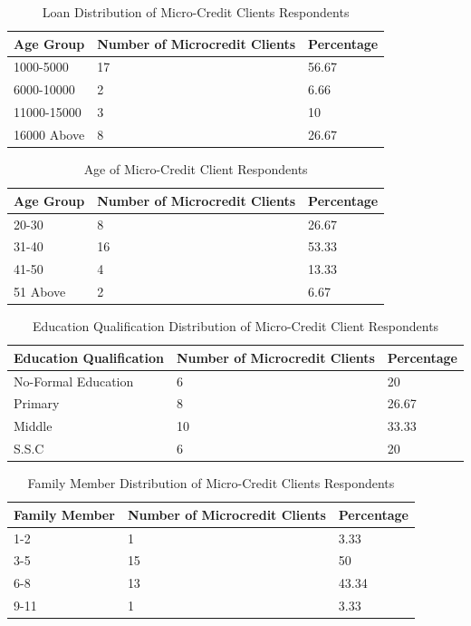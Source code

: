 \documentclass{report}
\begin{document}
\begin{table}[h!]
  \centering
  \begin{tabular}{|l|l|l|}
  \hline
    \textbf{Age Group} & \textbf{Number of Microcredit Clients} & \textbf{Percentage}\\
    \hline
    1000-5000 & 17 & 56.67\\
    6000-10000 & 2 & 6.66\\
    11000-15000 & 3 & 10\\
    16000 Above & 8 & 26.67\\
    \hline
  \end{tabular}
  \caption{Loan Distribution of Micro-Credit Clients Respondents}
\end{table}

\begin{table}[h!]
  \centering
  \begin{tabular}{|l|l|l|}
  \hline
    \textbf{Age Group} & \textbf{Number of Microcredit Clients} & \textbf{Percentage}\\
    \hline
    20-30 & 8 & 26.67\\
    31-40 & 16 & 53.33\\
    41-50 & 4 & 13.33\\
    51 Above & 2 & 6.67\\
    \hline
  \end{tabular}
  \caption{Age of Micro-Credit Client Respondents}
\end{table}

\begin{table}[h!]
  \centering
  \begin{tabular}{|l|l|l|}
  \hline
    \textbf{Education Qualification} & \textbf{Number of Microcredit Clients} & \textbf{Percentage}\\
    \hline
    No-Formal Education & 6 & 20\\
    Primary & 8 & 26.67\\
    Middle & 10 & 33.33\\
    S.S.C & 6 & 20\\
    \hline
  \end{tabular}
  \caption{Education Qualification Distribution of Micro-Credit Client Respondents}
\end{table}

\begin{table}[h!]
  \centering
  \begin{tabular}{|l|l|l|}
  \hline
    \textbf{Family Member} & \textbf{Number of Microcredit Clients} & \textbf{Percentage}\\
    \hline
    1-2 & 1 & 3.33\\
    3-5 & 15 & 50\\
    6-8 & 13 & 43.34\\
    9-11 & 1 & 3.33\\
    \hline
  \end{tabular}
  \caption{Family Member Distribution of Micro-Credit Clients Respondents}
\end{table}
\end{document}
